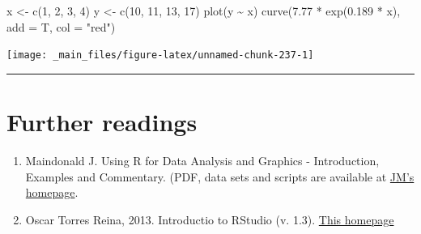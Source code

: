 \documentclass[a4paper,12pt,oneside]{book}
\providecommand{\tightlist}{%
  \setlength{\itemsep}{0pt}\setlength{\parskip}{0pt}}
\newenvironment{Shaded}{\begin{snugshade}}{\end{snugshade}}
\newcommand{\DecValTok}[1]{#1}
\newcommand{\FloatTok}[1]{#1}
\newcommand{\SpecialCharTok}[1]{#1}
\newcommand{\StringTok}[1]{#1}
\newcommand{\OtherTok}[1]{#1}
\newcommand{\FunctionTok}[1]{#1}
\newcommand{\AttributeTok}[1]{#1}
\newcommand{\NormalTok}[1]{#1}
\begin{document}
\begin{Shaded}
\begin{Highlighting}[]
\NormalTok{x  }\OtherTok{\textless{}{-}}  \FunctionTok{c}\NormalTok{(}\DecValTok{1}\NormalTok{, }\DecValTok{2}\NormalTok{, }\DecValTok{3}\NormalTok{, }\DecValTok{4}\NormalTok{)}
\NormalTok{y  }\OtherTok{\textless{}{-}}  \FunctionTok{c}\NormalTok{(}\DecValTok{10}\NormalTok{, }\DecValTok{11}\NormalTok{, }\DecValTok{13}\NormalTok{, }\DecValTok{17}\NormalTok{)}
\FunctionTok{plot}\NormalTok{(y }\SpecialCharTok{\textasciitilde{}}\NormalTok{ x)}
\FunctionTok{curve}\NormalTok{(}\FloatTok{7.77} \SpecialCharTok{*} \FunctionTok{exp}\NormalTok{(}\FloatTok{0.189} \SpecialCharTok{*}\NormalTok{ x), }\AttributeTok{add =}\NormalTok{ T, }\AttributeTok{col =} \StringTok{"red"}\NormalTok{)}
\end{Highlighting}
\end{Shaded}

\texttt{[image: \_main\_files/figure-latex/unnamed-chunk-237-1]}

\begin{center}\rule{0.5\linewidth}{0.5pt}\end{center}

\hypertarget{further-readings-12}{%
\section{Further readings}\label{further-readings-12}}

\begin{enumerate}
\def\labelenumi{\arabic{enumi}.}
\tightlist
\item
  Maindonald J. Using R for Data Analysis and Graphics - Introduction, Examples and Commentary. (PDF, data sets and scripts are available at \href{https://cran.r-project.org/doc/contrib/usingR.pdff}{JM's homepage}.
\item
  Oscar Torres Reina, 2013. Introductio to RStudio (v. 1.3). \href{https://dss.princeton.edu/training/RStudio101.pdf}{This homepage}
\end{enumerate}
\end{document}
